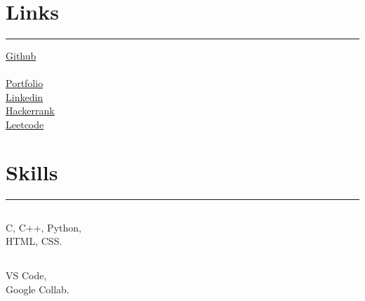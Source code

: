 \documentclass[]{sundar}
\begin{document}
%
%

\begin{minipage}[t]{0.33\textwidth} 
\begin{large}
	\\
\end{large}
\vspace{17pt}
 


\section{Links} 
\noindent\rule{5cm}{0.4pt}

 \faGithub \enspace\href{https://github.com/sundar68}{Github} \\
 \\
 \faUser \enspace \href{https://sundar68.github.io/three}{Portfolio} \\
 
\faLinkedin \enspace\href{https://www.linkedin.com/in/keerthi-satya-sai-sundar-900a0b196}{Linkedin} \\

\faArrowCircleRight \enspace\href{https://www.hackerrank.com/sundarkeerthi111}{Hackerrank} \\

\faArrowCircleRight \enspace\href{https://leetcode.com/sundar68/}{Leetcode} 
\vspace{6pt}
\vspace{6pt}
\vspace{6pt}
\vspace{6pt}
\sectionsep
\section{Skills}
\noindent\rule{5cm}{0.4pt}

\subsection{}
\vspace{3pt}
C, C++, Python,\\
HTML, CSS.
\vspace{10pt}
\subsection{}
\vspace{3pt}
VS Code, \\
Google Collab.
\vspace{10pt}

\end{minipage}
\end{document}

